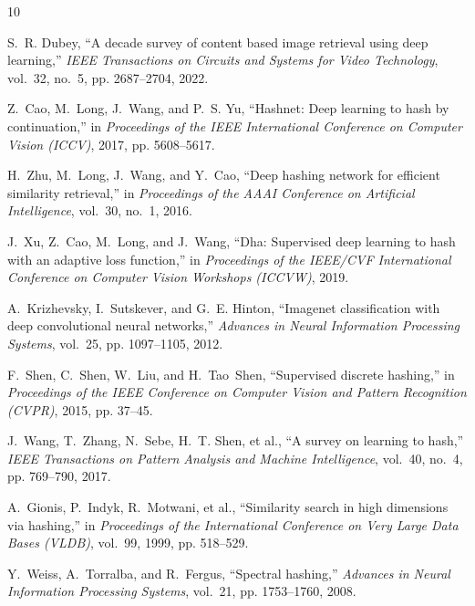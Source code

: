 \documentclass[10pt,conference]{IEEEtran}
\begin{document}
\begin{thebibliography}{10}

S.~R. Dubey, ``A decade survey of content based image retrieval using deep learning,'' \emph{IEEE Transactions on Circuits and Systems for Video Technology}, vol.~32, no.~5, pp. 2687--2704, 2022.

Z.~Cao, M.~Long, J.~Wang, and P.~S. Yu, ``Hashnet: Deep learning to hash by continuation,'' in \emph{Proceedings of the IEEE International Conference on Computer Vision (ICCV)}, 2017, pp. 5608--5617.

H.~Zhu, M.~Long, J.~Wang, and Y.~Cao, ``Deep hashing network for efficient similarity retrieval,'' in \emph{Proceedings of the AAAI Conference on Artificial Intelligence}, vol.~30, no.~1, 2016.

J.~Xu, Z.~Cao, M.~Long, and J.~Wang, ``Dha: Supervised deep learning to hash with an adaptive loss function,'' in \emph{Proceedings of the IEEE/CVF International Conference on Computer Vision Workshops (ICCVW)}, 2019.

A.~Krizhevsky, I.~Sutskever, and G.~E. Hinton, ``Imagenet classification with deep convolutional neural networks,'' \emph{Advances in Neural Information Processing Systems}, vol.~25, pp. 1097--1105, 2012.

F.~Shen, C.~Shen, W.~Liu, and H.~Tao~Shen, ``Supervised discrete hashing,'' in \emph{Proceedings of the IEEE Conference on Computer Vision and Pattern Recognition (CVPR)}, 2015, pp. 37--45.

J.~Wang, T.~Zhang, N.~Sebe, H.~T. Shen, et al., ``A survey on learning to hash,'' \emph{IEEE Transactions on Pattern Analysis and Machine Intelligence}, vol.~40, no.~4, pp. 769--790, 2017.

A.~Gionis, P.~Indyk, R.~Motwani, et al., ``Similarity search in high dimensions via hashing,'' in \emph{Proceedings of the International Conference on Very Large Data Bases (VLDB)}, vol.~99, 1999, pp. 518--529.

Y.~Weiss, A.~Torralba, and R.~Fergus, ``Spectral hashing,'' \emph{Advances in Neural Information Processing Systems}, vol.~21, pp. 1753--1760, 2008.


\end{thebibliography}
\end{document}
